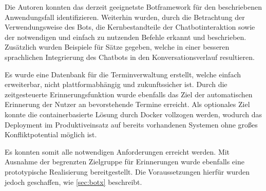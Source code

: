 Die Autoren konnten das derzeit geeignetste Botframework für den beschriebenen Anwendungsfall identifizieren. Weiterhin wurden, durch die Betrachtung der Verwendungsweise des Bots, die Kernbestandteile der Chatbotinteraktion sowie der notwendigen und einfach zu nutzenden Befehle erkannt und beschrieben. Zusätzlich wurden Beispiele für Sätze gegeben, welche in einer besseren sprachlichen Integrierung des Chatbots in den Konversationsverlauf resultieren. 

Es wurde eine Datenbank für die Terminverwaltung erstellt, welche einfach erweiterbar, nicht plattformabhängig und zukunftssicher ist. Durch die zeitgesteuerte Erinnerungsfunktion wurde ebenfalls das Ziel der automatischen Erinnerung der Nutzer an bevorstehende Termine erreicht. Als optionales Ziel konnte die containerbasierte Lösung durch Docker vollzogen werden, wodurch das Deployment im Produktiveinsatz auf bereits vorhandenen Systemen ohne großes Konfliktpotential möglich ist.

Es konnten somit alle notwendigen Anforderungen erreicht werden. Mit Ausnahme der begrenzten Zielgruppe für Erinnerungen wurde ebenfalls eine prototypische Realisierung bereitgestellt. Die Voraussetzungen hierfür wurden jedoch geschaffen, wie \autoref{sec:botx} beschreibt.

